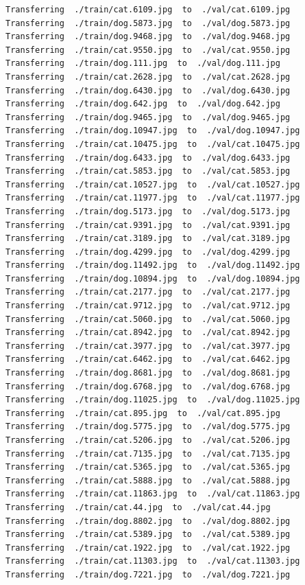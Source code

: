 \documentclass[]{book}
\theoremstyle{definition}
\theoremstyle{definition}
\theoremstyle{definition}
\theoremstyle{remark}
\begin{document}
\begin{verbatim}
Transferring  ./train/cat.6109.jpg  to  ./val/cat.6109.jpg
Transferring  ./train/dog.5873.jpg  to  ./val/dog.5873.jpg
Transferring  ./train/dog.9468.jpg  to  ./val/dog.9468.jpg
Transferring  ./train/cat.9550.jpg  to  ./val/cat.9550.jpg
Transferring  ./train/dog.111.jpg  to  ./val/dog.111.jpg
Transferring  ./train/cat.2628.jpg  to  ./val/cat.2628.jpg
Transferring  ./train/dog.6430.jpg  to  ./val/dog.6430.jpg
Transferring  ./train/dog.642.jpg  to  ./val/dog.642.jpg
Transferring  ./train/dog.9465.jpg  to  ./val/dog.9465.jpg
Transferring  ./train/dog.10947.jpg  to  ./val/dog.10947.jpg
Transferring  ./train/cat.10475.jpg  to  ./val/cat.10475.jpg
Transferring  ./train/dog.6433.jpg  to  ./val/dog.6433.jpg
Transferring  ./train/cat.5853.jpg  to  ./val/cat.5853.jpg
Transferring  ./train/cat.10527.jpg  to  ./val/cat.10527.jpg
Transferring  ./train/cat.11977.jpg  to  ./val/cat.11977.jpg
Transferring  ./train/dog.5173.jpg  to  ./val/dog.5173.jpg
Transferring  ./train/cat.9391.jpg  to  ./val/cat.9391.jpg
Transferring  ./train/cat.3189.jpg  to  ./val/cat.3189.jpg
Transferring  ./train/dog.4299.jpg  to  ./val/dog.4299.jpg
Transferring  ./train/dog.11492.jpg  to  ./val/dog.11492.jpg
Transferring  ./train/dog.10894.jpg  to  ./val/dog.10894.jpg
Transferring  ./train/cat.2177.jpg  to  ./val/cat.2177.jpg
Transferring  ./train/cat.9712.jpg  to  ./val/cat.9712.jpg
Transferring  ./train/cat.5060.jpg  to  ./val/cat.5060.jpg
Transferring  ./train/cat.8942.jpg  to  ./val/cat.8942.jpg
Transferring  ./train/cat.3977.jpg  to  ./val/cat.3977.jpg
Transferring  ./train/cat.6462.jpg  to  ./val/cat.6462.jpg
Transferring  ./train/dog.8681.jpg  to  ./val/dog.8681.jpg
Transferring  ./train/dog.6768.jpg  to  ./val/dog.6768.jpg
Transferring  ./train/dog.11025.jpg  to  ./val/dog.11025.jpg
Transferring  ./train/cat.895.jpg  to  ./val/cat.895.jpg
Transferring  ./train/dog.5775.jpg  to  ./val/dog.5775.jpg
Transferring  ./train/cat.5206.jpg  to  ./val/cat.5206.jpg
Transferring  ./train/cat.7135.jpg  to  ./val/cat.7135.jpg
Transferring  ./train/cat.5365.jpg  to  ./val/cat.5365.jpg
Transferring  ./train/cat.5888.jpg  to  ./val/cat.5888.jpg
Transferring  ./train/cat.11863.jpg  to  ./val/cat.11863.jpg
Transferring  ./train/cat.44.jpg  to  ./val/cat.44.jpg
Transferring  ./train/dog.8802.jpg  to  ./val/dog.8802.jpg
Transferring  ./train/cat.5389.jpg  to  ./val/cat.5389.jpg
Transferring  ./train/cat.1922.jpg  to  ./val/cat.1922.jpg
Transferring  ./train/cat.11303.jpg  to  ./val/cat.11303.jpg
Transferring  ./train/dog.7221.jpg  to  ./val/dog.7221.jpg

\end{verbatim}
\end{document}
